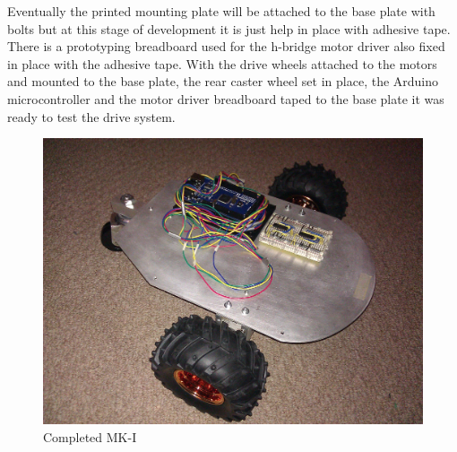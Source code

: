 Eventually the printed mounting plate will be attached to the base plate with bolts but at this stage of development it is just help in place with adhesive tape.  There is a prototyping breadboard used for the h-bridge motor driver also fixed in place with the adhesive tape. With the drive wheels attached to the motors and mounted to the base plate, the rear caster wheel set in place, the Arduino microcontroller and the motor driver breadboard taped to the base plate it was ready to test the drive system.
\begin{figure}[H]
\centering
        \includegraphics[width=5.0in]  {Images/tria-mkII.jpg}
        \caption{Completed MK-I}
        \label{Completed MK-I}
\end{figure}
